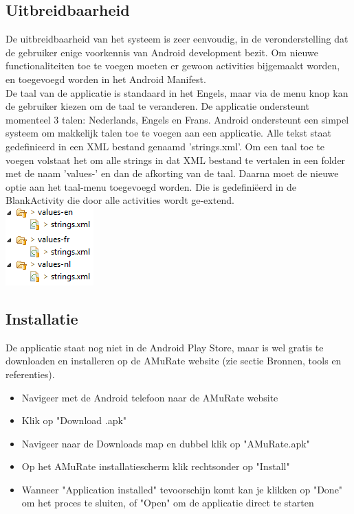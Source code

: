 \documentclass[11pt,a4paper]{article}
\begin{document}
	
	\subsection{Uitbreidbaarheid}
	\label{sec:Uitbreidbaarheid}
	De uitbreidbaarheid van het systeem is zeer eenvoudig, in de veronderstelling dat de gebruiker  enige voorkennis van Android development bezit. Om nieuwe functionaliteiten toe te voegen moeten er gewoon activities bijgemaakt worden, en toegevoegd worden in het Android Manifest.\\
	
	De taal van de applicatie is standaard in het Engels, maar via de menu knop kan de gebruiker kiezen om de taal te veranderen. De applicatie ondersteunt momenteel 3 talen: Nederlands, Engels en Frans. Android ondersteunt een simpel systeem om makkelijk talen toe te voegen aan een applicatie. Alle tekst staat gedefinieerd in een XML bestand genaamd 'strings.xml'. Om een taal toe te voegen volstaat het om alle strings in dat XML bestand te vertalen in een folder met de naam 'values-' en dan de afkorting van de taal. Daarna moet de nieuwe optie aan het taal-menu toegevoegd worden. Die is gedefiniëerd in de BlankActivity die door alle activities wordt ge-extend. \\
	\includegraphics[scale=1]{Pictures/lang_folder.png}
	
	\subsection{Installatie}
	\label{sec:Installatie}
	De applicatie staat nog niet in de Android Play Store, maar is wel gratis te downloaden en installeren op de AMuRate website (zie sectie Bronnen, tools en referenties). 
	\begin{itemize}
		\item Navigeer met de Android telefoon naar de AMuRate website 
		\item Klik op "Download .apk"
		\item Navigeer naar de Downloads map en dubbel klik op "AMuRate.apk"
		\item Op het AMuRate installatiescherm klik rechtsonder op "Install"
		\item Wanneer "Application installed" tevoorschijn komt kan je klikken op "Done" om het proces te sluiten, of "Open" om de applicatie direct te starten
	\end{itemize}
	
\end{document}

